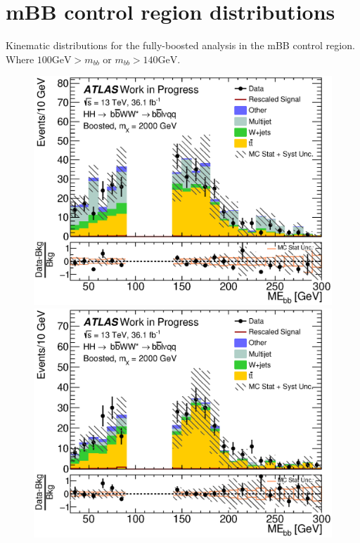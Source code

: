 \chapter{mBB control region distributions}
\label{app:fully_mbb_plots}
Kinematic distributions for the fully-boosted analysis in the mBB control region. Where ${100 \mathrm{GeV} > m_{bb}}$ or ${m_{bb} > 140 \mathrm{GeV}}$.
\begin{figure}[h]
\begin{center}
\includegraphics[scale=0.33]{figures/kinplots/C_2tag_mbbcr_elec_presel_met50_HbbMass}
\includegraphics[scale=0.33]{figures/kinplots/C_2tag_mbbcr_muon_presel_met50_HbbMass}\\

\end{center}
\end{figure}
